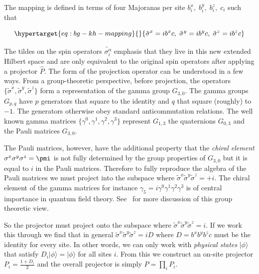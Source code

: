 The mapping is defined in terms of four Majoranas per site \(b_i^x,\;b_i^y,\;b_i^z,\;c_i\) such that

\begin{equation}\protect\hypertarget{eq:bg-kh-mapping}{}{\tilde{\sigma}^x = i b^x c,\; \tilde{\sigma}^y = i b^y c,\; \tilde{\sigma}^z = i b^z c}\label{eq:bg-kh-mapping}\end{equation}

The tildes on the spin operators \(\tilde{\sigma_i^\alpha}\) emphasis that they live in this new extended Hilbert space and are only equivalent to the original spin operators after applying a projector \(\hat{P}\). The form of the projection operator can be understood in a few ways. From a group-theoretic perspective, before projection, the operators \(\{\tilde{\sigma}^x, \tilde{\sigma}^y, \tilde{\sigma}^z\}\) form a representation of the gamma group \(G_{3,0}\). The gamma groups \(G_{p,q}\) have \(p\) generators that square to the identity and \(q\) that square (roughly) to \(-1\). The generators otherwise obey standard anticommutation relations. The well known gamma matrices \(\{\gamma^0, \gamma^1, \gamma^2, \gamma^3\}\) represent \(G_{1,3}\) the quaternions \(G_{0,3}\) and the Pauli matrices \(G_{3,0}\).

The Pauli matrices, however, have the additional property that the \emph{chiral element} \(\sigma^x \sigma^y \sigma^z = \pmi\) is not fully determined by the group properties of \(G_{3,0}\) but it is equal to \(i\) in the Pauli matrices. Therefore to fully reproduce the algebra of the Pauli matrices we must project into the subspace where \(\tilde{\sigma}^x \tilde{\sigma}^y \tilde{\sigma}^z = +i\). The chiral element of the gamma matrices for instance \(\gamma_5 = i\gamma^0 \gamma^1 \gamma^2 \gamma^3\) is of central importance in quantum field theory. See~\autocite{petitjeanChiralityDiracSpinors2020} for more discussion of this group theoretic view.

So the projector must project onto the subspace where \(\tilde \sigma^x \tilde \sigma^y \tilde \sigma^z = i\). If we work this through we find that in general \(\tilde \sigma^x \tilde \sigma^y \tilde\sigma^z = iD\) where \(D = b^x b^y b^z c\) must be the identity for every site. In other words, we can only work with \emph{physical states} \(|\phi\rangle\) that satisfy \(D_i|\phi\rangle = |\phi\rangle\) for all sites \(i\). From this we construct an on-site projector \(P_i = \frac{1 + D_i}{2}\) and the overall projector is simply \(P = \prod_i P_i\).

